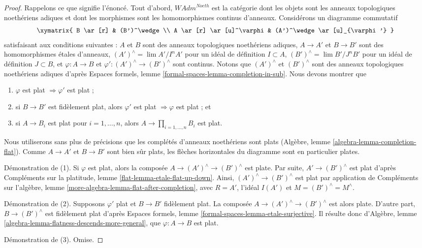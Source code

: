 \begin{proof}
Rappelons ce que signifie l'énoncé. Tout d'abord,
$\textit{WAdm}^{Noeth}$ est la catégorie dont les objets sont les anneaux
topologiques noethériens adiques et dont les morphismes sont les
homomorphismes continus d'anneaux. Considérons un diagramme commutatif
$$
\xymatrix{
B \ar[r] & (B')^\wedge \\
A \ar[r] \ar[u]^\varphi & (A')^\wedge \ar[u]_{\varphi'}
}
$$
satisfaisant aux conditions suivantes :
$A$ et $B$ sont des anneaux topologiques noethériens adiques,
$A \to A'$ et $B \to B'$ sont des homomorphismes étales d'anneaux,
$(A')^\wedge = \lim A'/I^nA'$ pour un idéal de définition $I \subset A$,
$(B')^\wedge = \lim B'/J^nB'$ pour un idéal de définition $J \subset B$, et
$\varphi : A \to B$ et $\varphi' : (A')^\wedge \to (B')^\wedge$
sont continus. Notons que $(A')^\wedge$ et $(B')^\wedge$ sont des anneaux
topologiques noethériens adiques d'après Espaces formels, lemme
\ref{formal-spaces-lemma-completion-in-sub}. Nous devons montrer que
\begin{enumerate}
\item $\varphi$ est plat $\Rightarrow \varphi'$ est plat ;
\item si $B \to B'$ est fidèlement plat, alors $\varphi'$ est plat
$\Rightarrow \varphi$ est plat ; et
\item si $A \to B_i$ est plat pour $i = 1, \ldots, n$, alors
$A \to \prod_{i = 1, \ldots, n} B_i$ est plat.
\end{enumerate}
Nous utiliserons sans plus de précisions que les complétés d'anneaux
noethériens sont plats (Algèbre, lemme \ref{algebra-lemma-completion-flat}).
Comme $A \to A'$ et $B \to B'$ sont bien sûr plats, les flèches
horizontales du diagramme sont en particulier plates.

\medskip\noindent
Démonstration de (1). Si $\varphi$ est plat, alors la composée
$A \to (A')^\wedge \to (B')^\wedge$ est plate. Par suite,
$A' \to (B')^\wedge$ est plat d'après Compléments sur la platitude,
lemme \ref{flat-lemma-etale-flat-up-down}. Ainsi,
$(A')^\wedge \to (B')^\wedge$ est plat par application de Compléments
sur l'algèbre, lemme \ref{more-algebra-lemma-flat-after-completion}, avec
$R = A'$, l'idéal $I(A')$ et $M = (B')^\wedge = M^\wedge$.

\medskip\noindent
Démonstration de (2). Supposons $\varphi'$ plat et $B \to B'$ fidèlement
plat. La composée $A \to (A')^\wedge \to (B')^\wedge$ est alors plate.
D'autre part, $B \to (B')^\wedge$ est fidèlement plat d'après Espaces
formels, lemme \ref{formal-spaces-lemma-etale-surjective}. Il résulte donc
d'Algèbre, lemme \ref{algebra-lemma-flatness-descends-more-general}, que
$\varphi : A \to B$ est plat.

\medskip\noindent
Démonstration de (3). Omise.
\end{proof}

